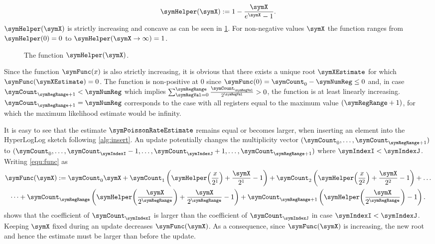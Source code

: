 \documentclass[a4paper]{scrartcl}
\begin{document}
\begin{equation}
\label{equ:helper}
\symHelper(\symX):=1-\frac{\symX}{e^{\symX}-1}.
\end{equation}
$\symHelper(\symX)$ is strictly increasing and concave as can be seen in \cref{fig:helper_function}. For non-negative values $\symX$ the function ranges from $\symHelper(0)=0$ to $\symHelper(\symX\rightarrow \infty)=1$.
\begin{figure}
\centering

\caption{The function $\symHelper(\symX)$.}
\label{fig:helper_function}
\end{figure}
Since the function $\symFunc(x)$ is also strictly increasing, it is obvious that there exists a unique root $\symXEstimate$ for which $\symFunc(\symXEstimate)=0$. The function is non-positive at 0 since $\symFunc(0)=\symCount_0-\symNumReg\leq 0$ and, in case $\symCount_{\symRegRange+1}<\symNumReg$ which implies $\sum_{\symRegVal=0}^\symRegRange \frac{\symCount_\symRegVal}{2^\symRegVal}>0$, the function is at least linearly increasing. $\symCount_{\symRegRange+1}=\symNumReg$ corresponds to the case with all registers equal to the maximum value $(\symRegRange+1)$, for which the maximum likelihood estimate would be infinity.

It is easy to see that the estimate $\symPoissonRateEstimate$ remains equal or becomes larger, when inserting an element into the HyperLogLog sketch following \cref{alg:insert}. An update potentially changes the multiplicity vector $(\symCount_0,\ldots,\symCount_{\symRegRange+1})$ to $(\symCount_0,\ldots,\symCount_\symIndexI-1,\ldots,\symCount_\symIndexJ+1,\ldots,\symCount_{\symRegRange+1})$ where $\symIndexI < \symIndexJ$. Writing \eqref{equ:func} as 
\begin{multline}
\symFunc(\symX)
:=
\symCount_0 \symX
+
\symCount_1 \left(
\symHelper\!\left(\frac{x}{2^1}\right)
+\frac{\symX}{2^1}-1
\right)
+
\symCount_2 \left(
\symHelper\!\left(\frac{x}{2^2}\right)
+\frac{\symX}{2^2}-1
\right)
+
\ldots
\\
\dots
+
\symCount_\symRegRange
\left(
\symHelper\!\left(\frac{\symX}{2^\symRegRange}\right)
+\frac{\symX}{2^\symRegRange}-1
\right)
+
\symCount_{\symRegRange+1}
\left(
\symHelper\!\left(\frac{\symX}{2^{\symRegRange}}\right)
-1
\right).
\end{multline}
shows that the coefficient of $\symCount_\symIndexI$ is larger than the coefficient of $\symCount_\symIndexJ$ in case $\symIndexI < \symIndexJ$. Keeping $\symX$ fixed during an update decreases $\symFunc(\symX)$. As a consequence, since $\symFunc(\symX)$ is increasing, the new root and hence the estimate must be larger than before the update.
\end{document}
